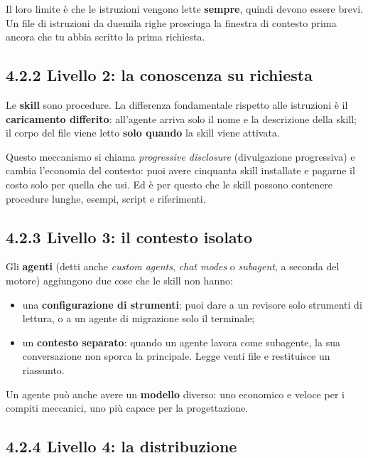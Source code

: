 \documentclass[
  italian,
  10pt,
]{book}
\providecommand{\tightlist}{%
  \setlength{\itemsep}{0pt}\setlength{\parskip}{0pt}}
\begin{document}
Il loro limite è che le istruzioni vengono lette \textbf{sempre}, quindi
devono essere brevi. Un file di istruzioni da duemila righe prosciuga la
finestra di contesto prima ancora che tu abbia scritto la prima
richiesta.

\subsection{4.2.2 Livello 2: la conoscenza su
richiesta}\label{livello-2-la-conoscenza-su-richiesta}

Le \textbf{skill} sono procedure. La differenza fondamentale rispetto
alle istruzioni è il \textbf{caricamento differito}: all'agente arriva
solo il nome e la descrizione della skill; il corpo del file viene letto
\textbf{solo quando} la skill viene attivata.

Questo meccanismo si chiama \emph{progressive disclosure} (divulgazione
progressiva) e cambia l'economia del contesto: puoi avere cinquanta
skill installate e pagarne il costo solo per quella che usi. Ed è per
questo che le skill possono contenere procedure lunghe, esempi, script e
riferimenti.

\subsection{4.2.3 Livello 3: il contesto
isolato}\label{livello-3-il-contesto-isolato}

Gli \textbf{agenti} (detti anche \emph{custom agents}, \emph{chat modes}
o \emph{subagent}, a seconda del motore) aggiungono due cose che le
skill non hanno:

\begin{itemize}
\tightlist
\item
  una \textbf{configurazione di strumenti}: puoi dare a un revisore solo
  strumenti di lettura, o a un agente di migrazione solo il terminale;
\item
  un \textbf{contesto separato}: quando un agente lavora come subagente,
  la sua conversazione non sporca la principale. Legge venti file e
  restituisce un riassunto.
\end{itemize}

Un agente può anche avere un \textbf{modello} diverso: uno economico e
veloce per i compiti meccanici, uno più capace per la progettazione.

\subsection{4.2.4 Livello 4: la
distribuzione}\label{livello-4-la-distribuzione}
\end{document}
